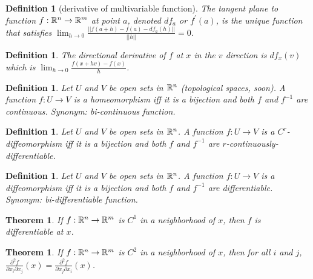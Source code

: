\documentclass[11pt,leqno,oneside]{amsart}
\newcommand{\de}{\emph}
\theoremstyle{mystyle} \newtheorem{thrm}[thm]{Theorem}
\theoremstyle{mystyle} \newtheorem{defi}[thm]{Definition}
\begin{document}
\begin{defi}[derivative of multivariable function]
	The \de{tangent plane} to function $f : {\mathbb R}^n \to {\mathbb R}^m$ at point $a$, denoted $df_a$ or $f^{\prime}(a)$, is the unique function that satisfies $\lim_{h\to 0} \frac{||f(a+h) - f(a) - df_a(h)||}{||h||} = 0$.
\end{defi}
\begin{defi}
	The \de{directional derivative} of $f$ at $x$ in the $v$ direction is $df_x(v)$ which is $\lim_{h\to 0} \frac{f(x+hv) - f(x)}{h}$.
\end{defi}
\begin{defi}
	Let $U$ and $V$ be open sets in ${\mathbb R}^n$ (topological spaces, soon).  A function $f:U\to V$ is a \de{homeomorphism} iff it is a bijection and both $f$ and $f^{-1}$ are continuous.
	Synonym: bi-continuous function.
\end{defi}
\begin{defi}
	Let $U$ and $V$ be open sets in ${\mathbb R}^n$.  A function $f:U\to V$ is a \de{$C^r$-diffeomorphism} iff it is a bijection and both $f$ and $f^{-1}$ are $r$-continuously-differentiable.
\end{defi}
\begin{defi}
	Let $U$ and $V$ be open sets in ${\mathbb R}^n$.  A function $f:U\to V$ is a \de{diffeomorphism} iff it is a bijection and both $f$ and $f^{-1}$ are differentiable.
	Synonym: bi-differentiable function.
\end{defi}
\begin{thrm}
	If $f:{\mathbb R}^n \to {\mathbb R}^m$ is $C^1$ in a neighborhood of $x$, then $f$ is differentiable at $x$.
\end{thrm}
\begin{thrm}
	If $f:{\mathbb R}^n \to {\mathbb R}^m$ is $C^2$ in a neighborhood of $x$, then for all $i$ and $j$, $\frac{\partial^2f}{\partial x_i \partial x_j}(x) = \frac{\partial^2f}{\partial x_j \partial x_i}(x)$.
\end{thrm}
\end{document}
